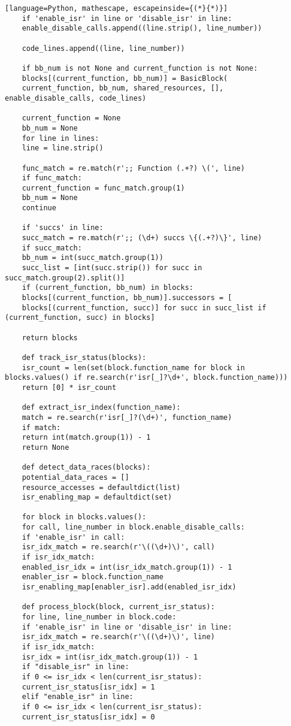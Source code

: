 \documentclass[
fancyheadings, %
%
%
]{stsreprt}
\begin{document}
{\begin{lstlisting}[language=Python, mathescape, escapeinside={(*}{*)}]
	if 'enable_isr' in line or 'disable_isr' in line:
	enable_disable_calls.append((line.strip(), line_number))
	
	code_lines.append((line, line_number))
	
	if bb_num is not None and current_function is not None:
	blocks[(current_function, bb_num)] = BasicBlock(
	current_function, bb_num, shared_resources, [], enable_disable_calls, code_lines)
	
	current_function = None
	bb_num = None
	for line in lines:
	line = line.strip()
	
	func_match = re.match(r';; Function (.+?) \(', line)
	if func_match:
	current_function = func_match.group(1)
	bb_num = None
	continue
	
	if 'succs' in line:
	succ_match = re.match(r';; (\d+) succs \{(.+?)\}', line)
	if succ_match:
	bb_num = int(succ_match.group(1))
	succ_list = [int(succ.strip()) for succ in succ_match.group(2).split()]
	if (current_function, bb_num) in blocks:
	blocks[(current_function, bb_num)].successors = [
	blocks[(current_function, succ)] for succ in succ_list if (current_function, succ) in blocks]
	
	return blocks
	
	def track_isr_status(blocks):
	isr_count = len(set(block.function_name for block in blocks.values() if re.search(r'isr[_]?\d+', block.function_name)))
	return [0] * isr_count  
	
	def extract_isr_index(function_name):
	match = re.search(r'isr[_]?(\d+)', function_name)
	if match:
	return int(match.group(1)) - 1
	return None
	
	def detect_data_races(blocks):
	potential_data_races = []
	resource_accesses = defaultdict(list)
	isr_enabling_map = defaultdict(set)
	
	for block in blocks.values():
	for call, line_number in block.enable_disable_calls:
	if 'enable_isr' in call:
	isr_idx_match = re.search(r'\((\d+)\)', call)
	if isr_idx_match:
	enabled_isr_idx = int(isr_idx_match.group(1)) - 1
	enabler_isr = block.function_name
	isr_enabling_map[enabler_isr].add(enabled_isr_idx)
	
	def process_block(block, current_isr_status):
	for line, line_number in block.code:
	if 'enable_isr' in line or 'disable_isr' in line:
	isr_idx_match = re.search(r'\((\d+)\)', line)
	if isr_idx_match:
	isr_idx = int(isr_idx_match.group(1)) - 1  
	if "disable_isr" in line:
	if 0 <= isr_idx < len(current_isr_status):
	current_isr_status[isr_idx] = 1
	elif "enable_isr" in line:
	if 0 <= isr_idx < len(current_isr_status):
	current_isr_status[isr_idx] = 0
	

\end{lstlisting}}
\end{document}
